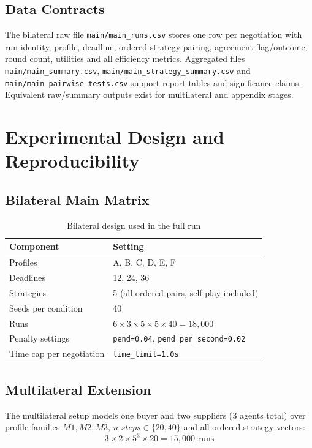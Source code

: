 \documentclass[11pt]{article}
\begin{document}
\subsection{Data Contracts}
The bilateral raw file \texttt{main/main\_runs.csv} stores one row per negotiation with run identity, profile, deadline, ordered strategy pairing, agreement flag/outcome, round count, utilities and all efficiency metrics. Aggregated files \texttt{main/main\_summary.csv}, \texttt{main/main\_strategy\_summary.csv} and \texttt{main/main\_pairwise\_tests.csv} support report tables and significance claims. Equivalent raw/summary outputs exist for multilateral and appendix stages.

\section{Experimental Design and Reproducibility}
\subsection{Bilateral Main Matrix}
\begin{table}[H]
\centering
\caption{Bilateral design used in the full run}
\begin{tabular}{ll}
\toprule
\textbf{Component} & \textbf{Setting} \\
\midrule
Profiles & A, B, C, D, E, F \\
Deadlines & 12, 24, 36 \\
Strategies & 5 (all ordered pairs, self-play included) \\
Seeds per condition & 40 \\
Runs & \(6 \times 3 \times 5 \times 5 \times 40 = 18{,}000\) \\
Penalty settings & \texttt{pend=0.04}, \texttt{pend\_per\_second=0.02} \\
Time cap per negotiation & \texttt{time\_limit=1.0s} \\
\bottomrule
\end{tabular}
\end{table}

\subsection{Multilateral Extension}
The multilateral setup models one buyer and two suppliers (3 agents total) over profile families \(M1, M2, M3\), \(n\_steps \in \{20,40\}\) and all ordered strategy vectors:
\[
3 \times 2 \times 5^3 \times 20 = 15{,}000 \text{ runs}
\]
\end{document}
